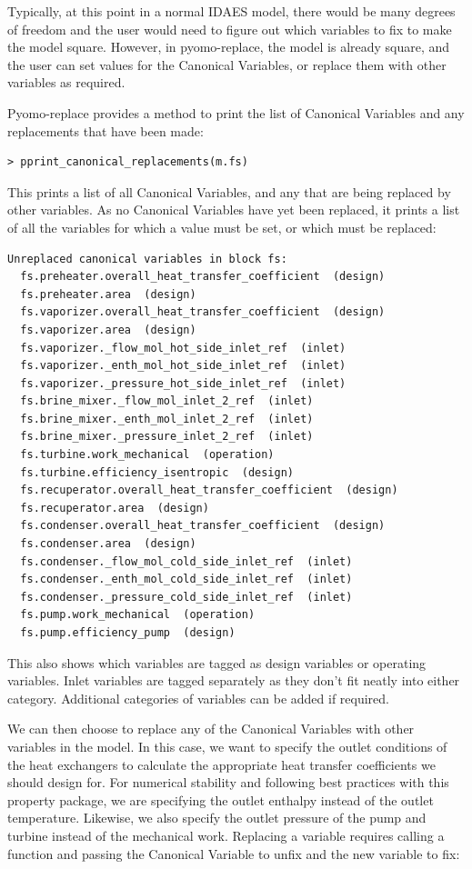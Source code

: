 Typically, at this point in a normal IDAES model, there would be many degrees of freedom and
the user would need to figure out which variables to fix to make the model square.
However, in pyomo-replace, the model is already square, and the user can
set values for the Canonical Variables, or replace them with other variables as required.

Pyomo-replace provides a method to print the list of Canonical Variables and any replacements that have been made:

\begin{verbatim}
> pprint_canonical_replacements(m.fs)
\end{verbatim}

This prints a list of all Canonical Variables, and any that are being
replaced by other variables. As no Canonical Variables have yet been
replaced, it prints a list of all the variables for which a value must
be set, or which must be replaced:

\begin{verbatim}
Unreplaced canonical variables in block fs:
  fs.preheater.overall_heat_transfer_coefficient  (design)
  fs.preheater.area  (design)
  fs.vaporizer.overall_heat_transfer_coefficient  (design)
  fs.vaporizer.area  (design)
  fs.vaporizer._flow_mol_hot_side_inlet_ref  (inlet)
  fs.vaporizer._enth_mol_hot_side_inlet_ref  (inlet)
  fs.vaporizer._pressure_hot_side_inlet_ref  (inlet)
  fs.brine_mixer._flow_mol_inlet_2_ref  (inlet)
  fs.brine_mixer._enth_mol_inlet_2_ref  (inlet)
  fs.brine_mixer._pressure_inlet_2_ref  (inlet)
  fs.turbine.work_mechanical  (operation)
  fs.turbine.efficiency_isentropic  (design)
  fs.recuperator.overall_heat_transfer_coefficient  (design)
  fs.recuperator.area  (design)
  fs.condenser.overall_heat_transfer_coefficient  (design)
  fs.condenser.area  (design)
  fs.condenser._flow_mol_cold_side_inlet_ref  (inlet)
  fs.condenser._enth_mol_cold_side_inlet_ref  (inlet)
  fs.condenser._pressure_cold_side_inlet_ref  (inlet)
  fs.pump.work_mechanical  (operation)
  fs.pump.efficiency_pump  (design)
\end{verbatim}

This also shows which variables are tagged as design variables or operating variables.
Inlet variables are tagged separately as they don't fit neatly into either category. 
Additional categories of variables can be added if required.

We can then choose to replace any of the Canonical Variables with other variables in the model.
In this case, we want to specify the outlet conditions of the heat exchangers to calculate the appropriate
heat transfer coefficients we should design for. For numerical stability and following best practices with this property package,
we are specifying the outlet enthalpy instead of the outlet temperature. Likewise, we also specify the outlet pressure of the pump and
turbine instead of the mechanical work.
Replacing a variable requires calling a function and passing the
Canonical Variable to unfix and the new variable to fix:

